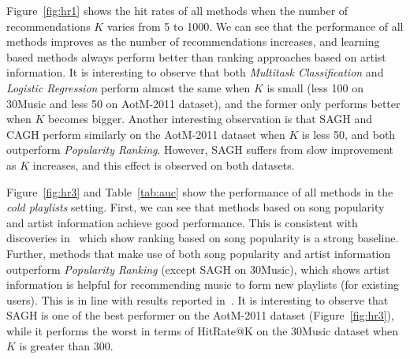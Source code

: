 Figure~\ref{fig:hr1} shows the hit rates of all methods when the number of recommendations $K$ varies from 5 to 1000.
We can see that the performance of all methods improves as the number of recommendations increases,
and learning based methods always perform better than ranking approaches based on artist information.
It is interesting to observe that both {\it Multitask Classification} and {\it Logistic Regression} perform 
almost the same when $K$ is small (less 100 on 30Music and less 50 on AotM-2011 dataset), 
and the former only performs better when $K$ becomes bigger.
Another interesting observation is that SAGH and CAGH perform similarly on the AotM-2011 dataset when $K$
is less 50, and both outperform {\it Popularity Ranking}. However, SAGH suffers from slow improvement
as $K$ increases, and this effect is observed on both datasets.

Figure~\ref{fig:hr3} and Table~\ref{tab:auc} show the performance of all methods in the \emph{cold playlists} setting.
First, we can see that methods based on song popularity and artist information achieve good performance.
This is consistent with discoveries in~\cite{bonnin2013evaluating,jannach2015beyond,bonnin2015automated} which 
show ranking based on song popularity is a strong baseline.
Further, methods that make use of both song popularity and artist information
outperform {\it Popularity Ranking} (except SAGH on 30Music), which shows artist information is helpful for 
recommending music to form new playlists (for existing users).
This is in line with results reported in~\cite{bonnin2013evaluating,bonnin2015automated}.
%
It is interesting to observe that SAGH is one of the best performer on the AotM-2011 dataset (Figure~\ref{fig:hr3}), 
while it performs the worst in terms of HitRate@K on the 30Music dataset when $K$ is greater than 300.
%


